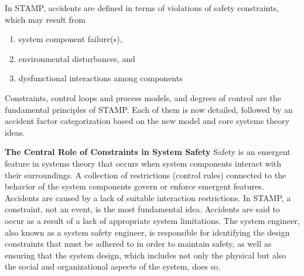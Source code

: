 In STAMP, accidents are defined in terms of violations of safety constraints, which may result from
\begin{enumerate}
	\item system component failure(s),
	\item environmental disturbances, and
	\item  dysfunctional interactions among components
\end{enumerate}


Constraints, control loops and process models, and degrees of control are the fundamental principles of STAMP. Each of them is now detailed, followed by an accident factor categorization based on the new model and core systems theory ideas.


\textbf{The Central Role of Constraints in System Safety}
Safety is an emergent feature in systems theory that occurs when system components interact with their surroundings. A collection of restrictions (control rules) connected to the behavior of the system components govern or enforce emergent features. Accidents are caused by a lack of suitable interaction restrictions. In STAMP, a constraint, not an event, is the most fundamental idea. Accidents are said to occur as a result of a lack of appropriate system limitations. The system engineer, also known as a system safety engineer, is responsible for identifying the design constraints that must be adhered to in order to maintain safety, as well as ensuring that the system design, which includes not only the physical but also the social and organizational aspects of the system, does so.

